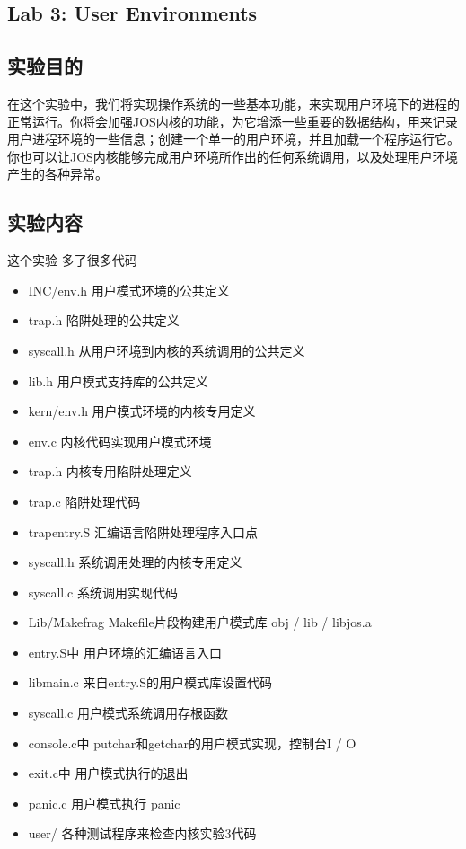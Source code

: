 \begin{ExerciseList}

  \setcounter{Exercise}{0}
  \section{Lab 3: User Environments}

  \subsection{实验目的}

  在这个实验中，我们将实现操作系统的一些基本功能，来实现用户环境下的进程的正常运行。你将会加强JOS内核的功能，为它增添一些重要的数据结构，用来记录用户进程环境的一些信息；创建一个单一的用户环境，并且加载一个程序运行它。你也可以让JOS内核能够完成用户环境所作出的任何系统调用，以及处理用户环境产生的各种异常。

  \subsection{实验内容}

这个实验 多了很多代码

\begin{itemize}
\item INC/env.h	用户模式环境的公共定义
\item trap.h	陷阱处理的公共定义
\item syscall.h	从用户环境到内核的系统调用的公共定义
\item lib.h	用户模式支持库的公共定义
\item kern/env.h	用户模式环境的内核专用定义
\item env.c	内核代码实现用户模式环境
\item trap.h	内核专用陷阱处理定义
\item trap.c	陷阱处理代码
\item trapentry.S	汇编语言陷阱处理程序入口点
\item syscall.h	系统调用处理的内核专用定义
\item syscall.c	系统调用实现代码
\item Lib/Makefrag	Makefile片段构建用户模式库 obj / lib / libjos.a
\item entry.S中	用户环境的汇编语言入口
\item libmain.c	来自entry.S的用户模式库设置代码
\item syscall.c	用户模式系统调用存根函数
\item console.c中	putchar和getchar的用户模式实现，控制台I / O
\item exit.c中	用户模式执行的退出
\item panic.c	用户模式执行 panic
\item user/\*	各种测试程序来检查内核实验3代码
\end{itemize}


\end{ExerciseList}
